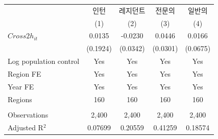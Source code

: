\begingroup
\centering
\begin{tabular}{lcccc}
   \toprule
                          & 인턴     & 레지던트 & 전문의   & 일반의 \\   
                          & (1)      & (2)      & (3)      & (4)\\  
   \midrule 
   $Cross2h_{it}$         & 0.0135   & -0.0230  & 0.0446   & 0.0166\\   
                          & (0.1924) & (0.0342) & (0.0301) & (0.0675)\\   
   Log population control & Yes      & Yes      & Yes      & Yes\\  
   Region FE              & Yes      & Yes      & Yes      & Yes\\  
   Year FE                & Yes      & Yes      & Yes      & Yes\\  
   Regions                & 160      & 160      & 160      & 160\\  
    \\
   Observations           & 2,400    & 2,400    & 2,400    & 2,400\\  
   Adjusted R$^2$         & 0.07699  & 0.20559  & 0.41259  & 0.18574\\  
   \bottomrule
\end{tabular}
\par\endgroup
